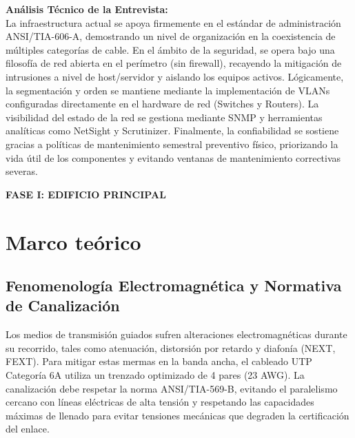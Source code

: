 \documentclass[11pt, letterpaper]{article}
\begin{document}
\vspace{0.5cm}

\noindent\textbf{Análisis Técnico de la Entrevista:} \\
La infraestructura actual se apoya firmemente en el estándar de administración ANSI/TIA-606-A, demostrando un nivel de organización en la coexistencia de múltiples categorías de cable. En el ámbito de la seguridad, se opera bajo una filosofía de red abierta en el perímetro (sin firewall), recayendo la mitigación de intrusiones a nivel de host/servidor y aislando los equipos activos. Lógicamente, la segmentación y orden se mantiene mediante la implementación de VLANs configuradas directamente en el hardware de red (Switches y Routers). La visibilidad del estado de la red se gestiona mediante SNMP y herramientas analíticas como NetSight y Scrutinizer. Finalmente, la confiabilidad se sostiene gracias a políticas de mantenimiento semestral preventivo físico, priorizando la vida útil de los componentes y evitando ventanas de mantenimiento correctivas severas.

\vspace{1cm}
\begin{tcolorbox}[enhanced, colback=AzulUNAM, colframe=AzulUNAM, arc=0mm, 
                  halign=center, valign=center, top=4mm, bottom=4mm]
    \LARGE\bfseries\color{white} FASE I: EDIFICIO PRINCIPAL
\end{tcolorbox}
\vspace{0.5cm}

\section{Marco teórico}

\subsection{Fenomenología Electromagnética y Normativa de Canalización}
Los medios de transmisión guiados sufren alteraciones electromagnéticas durante su recorrido, tales como atenuación, distorsión por retardo y diafonía (NEXT, FEXT). Para mitigar estas mermas en la banda ancha, el cableado UTP Categoría 6A utiliza un trenzado optimizado de 4 pares (23 AWG). La canalización debe respetar la norma ANSI/TIA-569-B, evitando el paralelismo cercano con líneas eléctricas de alta tensión y respetando las capacidades máximas de llenado para evitar tensiones mecánicas que degraden la certificación del enlace.
\end{document}
